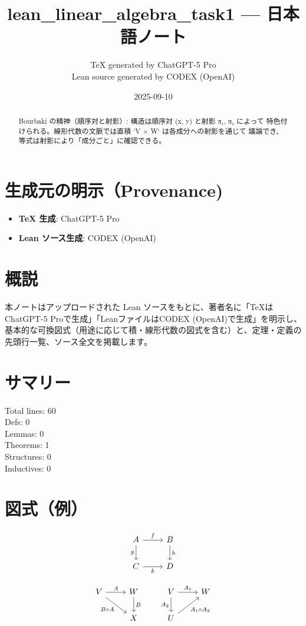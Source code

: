 \documentclass[12pt]{article}
\title{lean\_linear\_algebra\_task1 — 日本語ノート}
\author{TeX generated by ChatGPT-5 Pro\\Lean source generated by CODEX (OpenAI)}
\date{2025-09-10}
\theoremstyle{definition}
\begin{document}
\maketitle

\begin{abstract}
Bourbaki の精神（順序対と射影）: 構造は順序対 (x, y) と射影 π₁, π₂ によって
  特色付けられる。線形代数の文脈では直積 `V × W` は各成分への射影を通じて
  議論でき、等式は射影により「成分ごと」に確認できる。
\end{abstract}

\section*{生成元の明示（Provenance)}
\begin{itemize}
  \item \textbf{TeX 生成}: ChatGPT-5 Pro
  \item \textbf{Lean ソース生成}: CODEX (OpenAI)
\end{itemize}

\section*{概説}
本ノートはアップロードされた Lean ソースをもとに、著者名に「TeXはChatGPT-5 Proで生成」「LeanファイルはCODEX (OpenAI)で生成」を明示し、
基本的な可換図式（用途に応じて積・線形代数の図式を含む）と、定理・定義の先頭行一覧、ソース全文を掲載します。

\section*{サマリー}
Total lines: 60\\
Defs: 0\\
Lemmas: 0\\
Theorems: 1\\
Structures: 0\\
Inductives: 0

\section*{図式（例）}

\[
\begin{tikzcd}
A \arrow[r, "f"] \arrow[d, "g"'] & B \arrow[d, "h"] \\
C \arrow[r, "k"'] & D
\end{tikzcd}
\]



\[
\begin{tikzcd}
V \arrow[r, "A"] \arrow[dr, swap, "B\circ A"] & W \arrow[d, "B"] \\
& X
\end{tikzcd}
\qquad
\begin{tikzcd}
V \arrow[r, "A_1"] \arrow[d, "A_2"'] & W \\
U \arrow[ur, swap, "A_1\circ A_2"] &
\end{tikzcd}
\]
\end{document}
